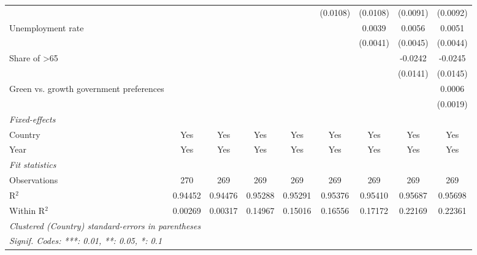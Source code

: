 \begin{table}[htbp]
\begin{tabular}{lcccccccc}
                                                      &          &          &                 &                 & (0.0108)        & (0.0108)        & (0.0091)        & (0.0092)\\   
      Unemployment rate                               &          &          &                 &                 &                 & 0.0039          & 0.0056          & 0.0051\\   
                                                      &          &          &                 &                 &                 & (0.0041)        & (0.0045)        & (0.0044)\\   
      Share of >65                                    &          &          &                 &                 &                 &                 & -0.0242         & -0.0245\\   
                                                      &          &          &                 &                 &                 &                 & (0.0141)        & (0.0145)\\   
      Green vs. growth government preferences         &          &          &                 &                 &                 &                 &                 & 0.0006\\   
                                                      &          &          &                 &                 &                 &                 &                 & (0.0019)\\   
      \midrule
      \emph{Fixed-effects}\\
      Country                                         & Yes      & Yes      & Yes             & Yes             & Yes             & Yes             & Yes             & Yes\\  
      Year                                            & Yes      & Yes      & Yes             & Yes             & Yes             & Yes             & Yes             & Yes\\  
      \midrule
      \emph{Fit statistics}\\
      Observations                                    & 270      & 269      & 269             & 269             & 269             & 269             & 269             & 269\\  
      R$^2$                                           & 0.94452  & 0.94476  & 0.95288         & 0.95291         & 0.95376         & 0.95410         & 0.95687         & 0.95698\\  
      Within R$^2$                                    & 0.00269  & 0.00317  & 0.14967         & 0.15016         & 0.16556         & 0.17172         & 0.22169         & 0.22361\\  
      \midrule \midrule
      \multicolumn{9}{l}{\emph{Clustered (Country) standard-errors in parentheses}}\\
      \multicolumn{9}{l}{\emph{Signif. Codes: ***: 0.01, **: 0.05, *: 0.1}}\\
   \end{tabular}
\end{table}


